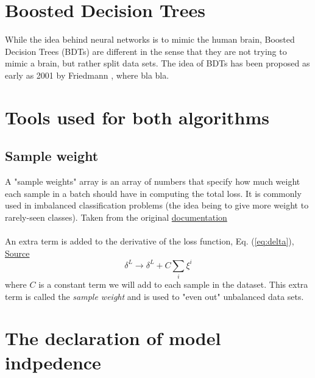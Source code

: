\documentclass[14pt, a4paper]{book}
\begin{document}
\clearpage




\section{Boosted Decision Trees}
While the idea behind neural networks is to mimic the human brain, Boosted Decision Trees (BDTs) are different in the sense that they are not trying to mimic a brain, but rather split data sets. The idea of BDTs has been proposed as early as 2001 by Friedmann \cite{BDT_Friedman}, 
where bla bla.

\section{Tools used for both algorithms}
\subsection{Sample weight}\label{sec:sample_weight}
A "sample weights" array is an array of numbers that specify how much weight each sample in a batch should have in computing the total loss. 
It is commonly used in imbalanced classification problems (the idea being to give more weight to rarely-seen classes). Taken from the original \href{https://www.tensorflow.org/guide/keras/train_and_evaluate#sample_weights}{documentation}\\
\\An extra term is added to the derivative of the loss function, Eq. (\ref{eq:delta}), \href{https://scikit-learn.org/stable/modules/svm.html#svc}{Source}
\begin{equation}
    \delta^L \rightarrow \delta^L + C\sum_i \xi^i
\end{equation} 
where $C$ is a constant term we will add to each sample in the dataset. This extra term is called the \textit{sample weight} and is used to "even out" unbalanced data sets. 

\section{The declaration of model indpedence}
\end{document}
